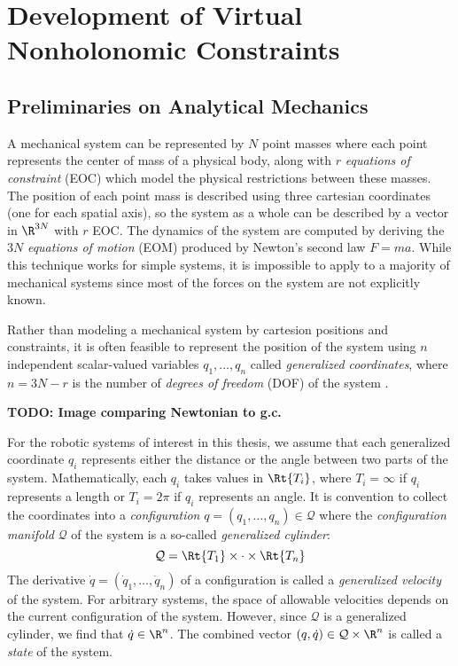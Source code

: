 

\chapter{Development of Virtual Nonholonomic Constraints}

\section{Preliminaries on Analytical Mechanics}
A mechanical system can be represented by \(N\) point masses where each point
represents the center of mass of a physical body, along with \(r\)
\textit{equations of constraint} (EOC) which model the physical restrictions
between these masses.
The position of each point mass is described using three cartesian coordinates (one
for each spatial axis), so the system as a whole can be described by a vector in
\(\R^{3N}\) with \(r\) EOC. 
The dynamics of the system are computed by deriving the \(3N\)
\textit{equations of motion} (EOM) produced by Newton's second law \(F = m a\).
While this technique works for simple systems, it is impossible to
apply to a majority of mechanical systems since most of the forces 
on the system are not explicitly known. 

Rather than modeling a mechanical system by cartesion positions and constraints,
it is often feasible to represent the position of the system using \(n\)
independent scalar-valued variables \(q_1,\ldots,q_n\) called 
\textit{generalized coordinates}, where \(n = 3N - r\) is the number of
\textit{degrees of freedom} (DOF) of the system \cite{greenwood_dynamics}.

\textbf{TODO: Image comparing Newtonian to g.c.}

For the robotic systems of interest in this thesis, we assume that
each generalized coordinate \(q_i\) represents either the distance or the angle
between two parts of the system.
Mathematically, each \(q_i\) takes values in \(\Rt{T_i}\), where
\(T_i = \infty\) if \(q_i\) represents a length or \(T_i = 2\pi\) if \(q_i\)
represents an angle.
It is convention to collect the coordinates into a \textit{configuration} 
\(q = (q_1,\ldots,q_n) \in \mathcal{Q}\) 
where the \textit{configuration manifold} \(\mathcal{Q}\) of the system is a
so-called \textit{generalized cylinder}:
\[
    \mathcal{Q} = \Rt{T_1} \times \cdot \times \Rt{T_n}
\] 
The derivative \(\dot{q} = (\dot{q}_1,\ldots,\dot{q}_n)\) of a configuration
is called a \textit{generalized velocity} of the system. For arbitrary systems,
the space of allowable velocities depends on the current configuration of the
system.  However, since \(\mathcal{Q}\) is a generalized cylinder, we find that 
\(\dot{q} \in \R^n\).
The combined vector \((q,\dot{q}) \in \mathcal{Q}\times\R^n\) is called a 
\textit{state} of the system.

